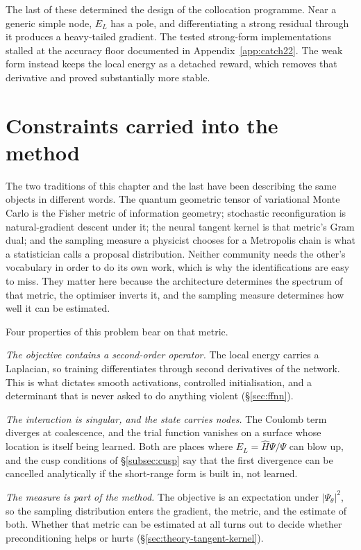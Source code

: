 The last of these determined the design of the collocation programme. Near a generic simple
node, $E_L$ has a pole, and differentiating a strong residual through it produces a
heavy-tailed gradient. The tested strong-form implementations stalled at the accuracy floor
documented in Appendix~\ref{app:catch22}. The weak form instead keeps the local energy as a
detached reward, which removes that derivative and proved substantially more stable.

\section{Constraints carried into the method}
\label{sec:ml_summary}

The two traditions of this chapter and the last have been describing the same objects in
different words. The quantum geometric tensor of variational Monte Carlo is the Fisher
metric of information geometry; stochastic reconfiguration is natural-gradient descent
under it; the neural tangent kernel is that metric's Gram dual; and the sampling measure a
physicist chooses for a Metropolis chain is what a statistician calls a proposal
distribution. Neither community needs the other's vocabulary in order to do its own work, which is why
the identifications are easy to miss. They matter here because the architecture determines
the spectrum of that metric, the optimiser inverts it, and the sampling measure determines
how well it can be estimated.

Four properties of this problem bear on that metric.

\emph{The objective contains a second-order operator.} The local energy carries a
Laplacian, so training differentiates through second derivatives of the network. This is
what dictates smooth activations, controlled initialisation, and a determinant that is
never asked to do anything violent (\S\ref{sec:ffnn}).

\emph{The interaction is singular, and the state carries nodes.} The Coulomb term diverges
at coalescence, and the trial function vanishes on a surface whose location is itself being
learned. Both are places where $E_L=\hat H\Psi/\Psi$ can blow up, and the cusp conditions
of \S\ref{subsec:cusp} say that the first divergence can be cancelled analytically if the
short-range form is built in, not learned.

\emph{The measure is part of the method.} The objective is an expectation under
$|\Psi_\theta|^2$, so the sampling distribution enters the gradient, the metric, and the
estimate of both. Whether that metric can be estimated at all turns out to decide whether
preconditioning helps or hurts (\S\ref{sec:theory-tangent-kernel}).

